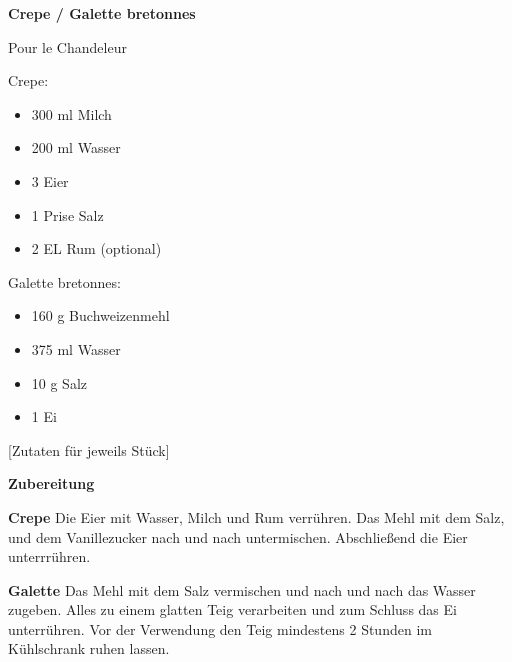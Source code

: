 

\parindent0pt	

\pagestyle{empty}


\textbf{\LARGE{Crepe / Galette bretonnes}}%

\hrulefill


Pour le Chandeleur
\vspace{0,5 cm}
\vspace*{\fill}
\begin{multicols}{2}	

Crepe:
\begin{itemize}
\item 300 ml Milch
\item 200 ml Wasser
\item 3 Eier
\item 1 Prise Salz
\item 2 EL Rum (optional)
\end{itemize}
Galette bretonnes:
\begin{itemize}
\item 160 g Buchweizenmehl
\item 375 ml Wasser
\item 10 g Salz
\item 1 Ei

\end{itemize}
\end{multicols}
\vfill									%

\vspace{1cm}
%
\begin{center}
%
[Zutaten für jeweils    Stück]%
\end{center}



\vfill
\newpage
\textbf{{\LARGE Zubereitung}}%

\hrulefill

\vspace*{\fill}
\begin{multicols}{2}

\textbf{Crepe}\newline
Die Eier mit Wasser, Milch und Rum verrühren. 
Das Mehl mit dem Salz, und dem Vanillezucker nach und nach untermischen.
Abschließend die  Eier unterrrühren.\newline
\newline



\textbf{Galette} \newline
Das Mehl mit dem Salz vermischen und nach und nach das Wasser zugeben.
Alles zu einem glatten Teig verarbeiten und zum Schluss das Ei unterrühren. 
Vor der Verwendung den Teig mindestens 2 Stunden im Kühlschrank ruhen lassen.\newline








\end{multicols}
\vfill
